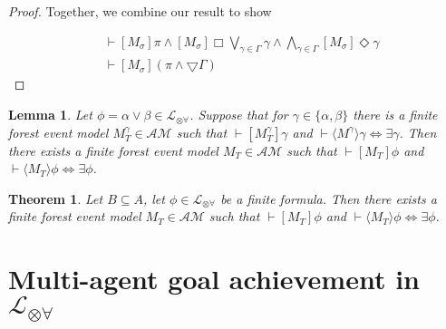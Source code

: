 \documentclass[12pt, a4paper, titlepage]{scrartcl}
\newtheorem{thm}{Theorem}[section]
\newtheorem{lemma}{Lemma}[section]
\numberwithin{equation}{section}
\newcommand{\cover}{\bigtriangledown}
\newcommand{\lang}{\mathcal{L}}
\newcommand{\langArbAct}{\lang_{\otimes\forall}}
\begin{document}
\begin{proof}
Together, we combine our result to show

\begin{align}
	& \vdash [M_\sigma] \pi \land [M_\sigma] \Box \bigvee_{\gamma \in \Gamma} \gamma \land
	\bigwedge_{\gamma \in \Gamma} [M_\sigma] \Diamond \gamma \\
	& \vdash [M_\sigma](\pi \land \cover \Gamma)
\end{align}

\end{proof}

\begin{lemma}
Let $\phi = \alpha \lor \beta \in \langArbAct$.
Suppose that for $\gamma \in \{\alpha, \beta\}$ there is a finite forest event model $M^\gamma_T \in \mathcal{AM}$ such that
$\vdash [M^\gamma_T] \gamma$
and $\vdash \langle M^\gamma \rangle \gamma \iff \exists \gamma$.
Then there exists a finite forest event model $M_T \in \mathcal{AM}$ such that $\vdash [M_T]\phi$ and
$\vdash \langle M_T \rangle \phi \iff \exists \phi$.
\end{lemma}

\begin{thm}
Let $B \subseteq A$, let $\phi \in \langArbAct$ be a finite formula.
Then there exists a finite forest event model $M_T \in \mathcal{AM}$ such that
$\vdash [M_T]\phi$ and $\vdash \langle M_T \rangle \phi \iff \exists \phi$.
\end{thm}

\section{Multi-agent goal achievement in $\langArbAct$}
\end{document}
